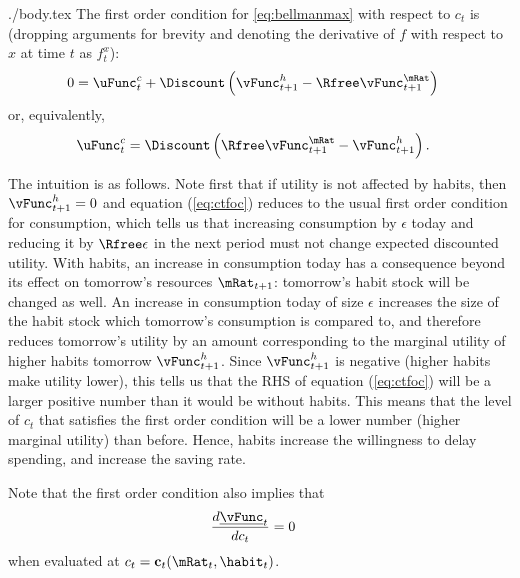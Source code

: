 \documentclass{handout}
\begin{document}
\begin{verbatimwrite}{./body.tex}
The first order condition for \eqref{eq:bellmanmax} with respect to
$c_{t}$ is (dropping arguments for brevity and denoting the derivative
of $f$ with respect to $x$ at time $t$ as $f^{x}_{t}$):
\begin{equation}\begin{gathered}\begin{aligned}
0 & =  \uFunc^{c}_{t} + \Discount \left(\vFunc^{h}_{t+1} - \Rfree \vFunc^{\mRat}_{t+1} \right)  \label{eq:ctfocraw} 
\end{aligned}\end{gathered}\end{equation}
or, equivalently,
\begin{equation}\begin{gathered}\begin{aligned}
\uFunc^{c}_{t} & =  \Discount \left(\Rfree \vFunc_{t+1}^{\mRat}- \vFunc_{t+1}^{h}\right). \label{eq:ctfoc}
\end{aligned}\end{gathered}\end{equation}

The intuition is as follows.  Note first that if 
utility is not affected by habits, then $\vFunc^{h}_{t+1}=0$ and equation 
(\ref{eq:ctfoc}) reduces to the usual first order condition for 
consumption, which tells us that increasing consumption by $\epsilon$ 
today and reducing it by $\Rfree \epsilon$ in the next period must not 
change expected discounted utility.  With habits, an increase in 
consumption today has a consequence beyond its effect on tomorrow's 
resources $\mRat_{t+1}$: tomorrow's habit stock will be changed as well.  
An increase in consumption today of size $\epsilon$ increases the size 
of the habit stock which tomorrow's consumption is compared to, and 
therefore reduces tomorrow's utility by an amount corresponding to the 
marginal utility of higher habits tomorrow $\vFunc^{h}_{t+1}$.  Since 
$\vFunc^{h}_{t+1}$ is negative (higher habits make utility lower), this 
tells us that the RHS of equation (\ref{eq:ctfoc}) will be a larger 
positive number than it would be without habits.  This means that the 
level of $c_{t}$ that satisfies the first order condition will be a 
lower number (higher marginal utility) than before.  Hence, habits 
increase the willingness to delay spending, and increase the saving 
rate.

Note that the first order condition also implies that 
\begin{equation}\begin{gathered}\begin{aligned}
        \frac{d \underline{\vFunc}_{t}}{d c_{t}} & =  0
\end{aligned}\end{gathered}\end{equation}
when evaluated at $c_{t}=\mathbf{c}_{t}(\mRat_{t},\habit_{t})$.


\end{verbatimwrite}
\end{document}
